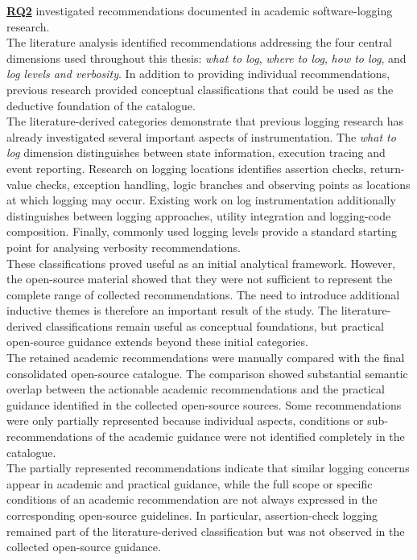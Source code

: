 \hyperref[table:t1rq]{\textbf{RQ2}} investigated recommendations documented in academic software-logging research.
\\
The literature analysis identified recommendations addressing the 
four central dimensions used throughout this thesis: \textit{what to log}, \textit{where to log},
\textit{how to log}, and \textit{log levels and verbosity}. In addition to providing individual
recommendations, previous research provided conceptual classifications that could be used as
the deductive foundation of the catalogue.
\\
The literature-derived categories demonstrate that previous logging research has already 
investigated several important aspects of instrumentation. The \textit{what to log} dimension
distinguishes between state information, execution tracing and event reporting. 
Research on logging locations identifies assertion checks, return-value checks, exception handling, 
logic branches and observing points as locations at which logging may occur. Existing work on 
log instrumentation additionally distinguishes between logging approaches, utility integration and 
logging-code composition. Finally, commonly used logging levels provide a standard starting 
point for analysing verbosity recommendations.
\\
These classifications proved useful as an initial analytical framework. 
However, the open-source material showed that they were not sufficient to represent the complete 
range of collected recommendations. The need to introduce additional inductive themes is therefore 
an important result of the study. The literature-derived classifications remain useful as conceptual 
foundations, but practical open-source guidance extends beyond these initial categories.
\\
The retained academic recommendations were manually compared with the final
consolidated open-source catalogue. The comparison showed substantial semantic
overlap between the actionable academic recommendations and the practical guidance
identified in the collected open-source sources. Some recommendations were only
partially represented because individual aspects, conditions or sub-recommendations
of the academic guidance were not identified completely in the catalogue.
\\
The partially represented recommendations indicate that similar logging concerns
appear in academic and practical guidance, while the full scope or specific
conditions of an academic recommendation are not always expressed in the
corresponding open-source guidelines. In particular, assertion-check logging
remained part of the literature-derived classification but was not observed in the
collected open-source guidance.

